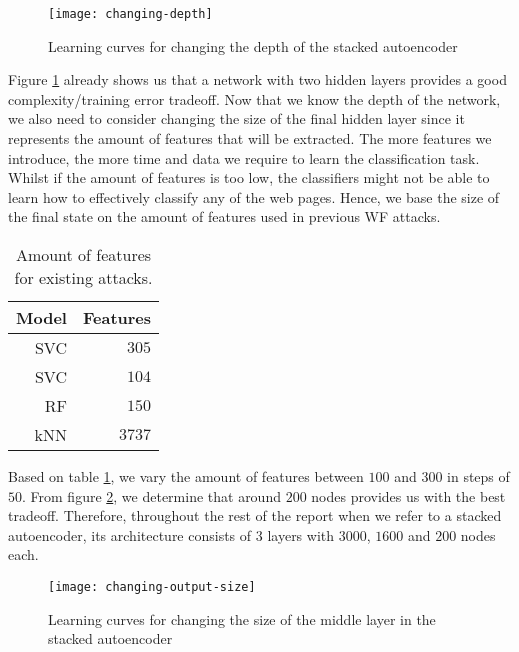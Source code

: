 \begin{figure}[ht]
  \centering
  \texttt{[image: changing-depth]}
  \caption{Learning curves for changing the depth of the stacked autoencoder}
  \label{fig:changing-depth}
\end{figure}

Figure \ref{fig:changing-depth} already shows us that a network with two hidden layers provides a good complexity/training error tradeoff.
Now that we know the depth of the network, we also need to consider changing the size of the final hidden layer since it represents the amount of features that will be extracted.
The more features we introduce, the more time and data we require to learn the classification task.
Whilst if the amount of features is too low, the classifiers might not be able to learn how to effectively classify any of the web pages.
Hence, we base the size of the final state on the amount of features used in previous WF attacks.

\begin{table}[ht]
  \centering
  \begin{tabular}{ r r } \hline
    \multicolumn{1}{c}{\textbf{Model}} & \multicolumn{1}{c}{\textbf{Features}} \\ \hline
    SVC \cite{panchenko1} & $305$ \\
    SVC \cite{panchenko2} & $104$ \\
    RF \cite{kfingerprinting} & $150$ \\
    kNN \cite{wang_cai_johnson_nithyanand_goldberg_2014} & $3737$ \\
    \hline
  \end{tabular}
  \caption{Amount of features for existing attacks.}
  \label{table:feature-wf-attacks}
\end{table}

Based on table \ref{table:feature-wf-attacks}, we vary the amount of features between $100$ and $300$ in steps of $50$.
From figure \ref{fig:changing-output-size}, we determine that around $200$ nodes provides us with the best tradeoff.
Therefore, throughout the rest of the report when we refer to a stacked autoencoder, its architecture consists of $3$ layers with $3000$, $1600$ and $200$ nodes each.

\begin{figure}[ht]
  \centering
  \texttt{[image: changing-output-size]}
  \caption{Learning curves for changing the size of the middle layer in the stacked autoencoder}
  \label{fig:changing-output-size}
\end{figure}

